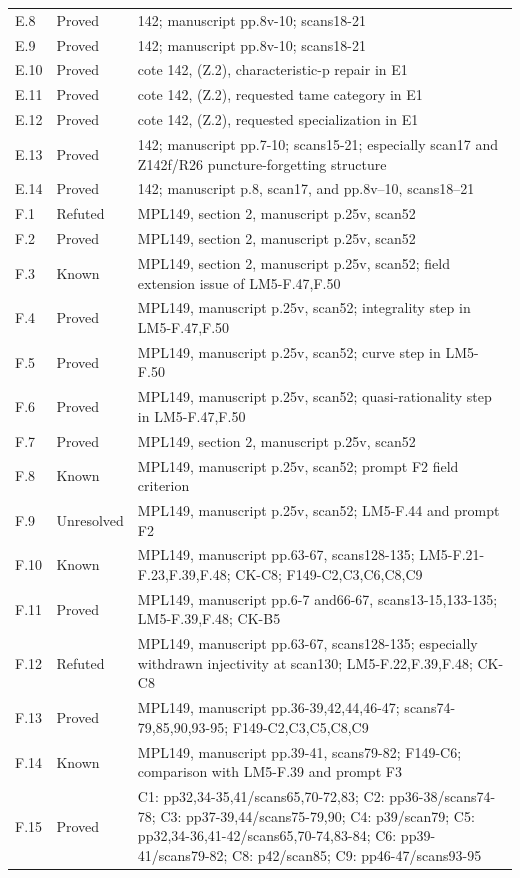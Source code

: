 {\begin{longtable}{p{1.9cm}p{1.7cm}p{10.3cm}}
E.8 & Proved & 142; manuscript pp.8v-10; scans18-21 \\
E.9 & Proved & 142; manuscript pp.8v-10; scans18-21 \\
E.10 & Proved & cote 142, (Z.2), characteristic-p repair in E1 \\
E.11 & Proved & cote 142, (Z.2), requested tame category in E1 \\
E.12 & Proved & cote 142, (Z.2), requested specialization in E1 \\
E.13 & Proved & 142; manuscript pp.7-10; scans15-21; especially scan17 and Z142f/R26 puncture-forgetting structure \\
E.14 & Proved & 142; manuscript p.8, scan17, and pp.8v–10, scans18–21 \\
F.1 & Refuted & MPL149, section 2, manuscript p.25v, scan52 \\
F.2 & Proved & MPL149, section 2, manuscript p.25v, scan52 \\
F.3 & Known & MPL149, section 2, manuscript p.25v, scan52; field extension issue of LM5-F.47,F.50 \\
F.4 & Proved & MPL149, manuscript p.25v, scan52; integrality step in LM5-F.47,F.50 \\
F.5 & Proved & MPL149, manuscript p.25v, scan52; curve step in LM5-F.50 \\
F.6 & Proved & MPL149, manuscript p.25v, scan52; quasi-rationality step in LM5-F.47,F.50 \\
F.7 & Proved & MPL149, section 2, manuscript p.25v, scan52 \\
F.8 & Known & MPL149, manuscript p.25v, scan52; prompt F2 field criterion \\
F.9 & Unresolved & MPL149, manuscript p.25v, scan52; LM5-F.44 and prompt F2 \\
F.10 & Known & MPL149, manuscript pp.63-67, scans128-135; LM5-F.21-F.23,F.39,F.48; CK-C8; F149-C2,C3,C6,C8,C9 \\
F.11 & Proved & MPL149, manuscript pp.6-7 and66-67, scans13-15,133-135; LM5-F.39,F.48; CK-B5 \\
F.12 & Refuted & MPL149, manuscript pp.63-67, scans128-135; especially withdrawn injectivity at scan130; LM5-F.22,F.39,F.48; CK-C8 \\
F.13 & Proved & MPL149, manuscript pp.36-39,42,44,46-47; scans74-79,85,90,93-95; F149-C2,C3,C5,C8,C9 \\
F.14 & Known & MPL149, manuscript pp.39-41, scans79-82; F149-C6; comparison with LM5-F.39 and prompt F3 \\
F.15 & Proved & C1: pp32,34-35,41/scans65,70-72,83; C2: pp36-38/scans74-78; C3: pp37-39,44/scans75-79,90; C4: p39/scan79; C5: pp32,34-36,41-42/scans65,70-74,83-84; C6: pp39-41/scans79-82; C8: p42/scan85; C9: pp46-47/scans93-95 \\

\end{longtable}}
